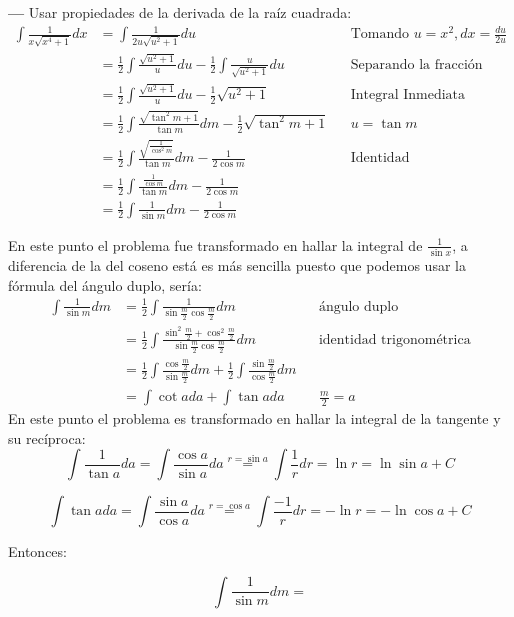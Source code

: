 \documentclass[14pt]{extarticle}
\begin{document}
    \textbf{---} Usar propiedades de la derivada de la raíz cuadrada:
      \begin{align}
            \int \frac{1}{x\sqrt{x^4+1}}dx 
            &=  \int \frac{1}{2u\sqrt{u^2+1}}du  && \text{Tomando $u = x^2,  dx = \frac{du}{2u}$} \\ 
            &= \frac{1}{2} \int \frac{\sqrt{u^2+1}}{u}du -  \frac{1}{2} \int  \frac{u}{\sqrt{u^2+1}}du && \text{Separando la fracción} \\
            &= \frac{1}{2} \int \frac{\sqrt{u^2+1}}{u}du - \frac{1}{2}\sqrt{u^2+1} && \text{Integral Inmediata} \\
            &= \frac{1}{2} \int \frac{\sqrt{\tan^2 m +1}}{\tan m}dm - \frac{1}{2}\sqrt{\tan^2 m+1} && \text{$u = \tan m$ } \\
            &= \frac{1}{2} \int \frac{\sqrt{\frac{1}{\cos^2 m}}}{\tan m}dm - \frac{1}{2\cos m} && \text{Identidad } \\
            &= \frac{1}{2} \int \frac{\frac{1}{\cos m}}{\tan m}dm - \frac{1}{2\cos m}  \\
            &= \frac{1}{2} \int \frac{1}{\sin m}dm - \frac{1}{2\cos m}  
      \end{align}      

      En este punto el problema fue transformado en hallar la integral de $\frac{1}{\sin x}$, a diferencia de la del coseno está es más sencilla puesto que podemos usar
      la fórmula del ángulo duplo, sería:
      \begin{align}
            \int \frac{1}{\sin m} dm 
            &= \frac{1}{2} \int \frac{1}{\sin{\frac{m}{2}}\cos{\frac{m}{2}}}dm  && \text{ángulo duplo} \\
            &= \frac{1}{2} \int \frac{\sin^2{\frac{m}{2}} + \cos^2{\frac{m}{2}}}{\sin{\frac{m}{2}}\cos{\frac{m}{2}}}dm  && \text{identidad trigonométrica} \\
            &= \frac{1}{2} \int \frac{\cos{\frac{m}{2}}}{\sin{\frac{m}{2}}}dm + \frac{1}{2} \int \frac{\sin{\frac{m}{2}}}{\cos{\frac{m}{2}}}dm \\
            &= \int \cot{a} da + \int \tan{a}da && \text{$\frac{m}{2} = a$} 
      \end{align}
      En este punto el problema es transformado en hallar la integral de la tangente y su recíproca:
      $$\int \frac{1}{\tan a} da = \int \frac{\cos a}{\sin a} da \stackrel{r = \sin{a}}{=} \int \frac{1}{r}dr = \ln{r} = \ln{\sin a}+C$$

      $$\int \tan a da = \int \frac{\sin a}{\cos a}da \stackrel{r = \cos{a}}{=} \int \frac{-1}{r}dr = -\ln{r} = -\ln{\cos a}+C$$
      
Entonces:

$$\int \frac{1}{\sin m} dm =  $$ 

       
\end{document}
